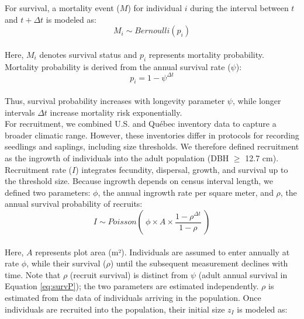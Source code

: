 For survival, a mortality event (\(M\)) for individual \(i\) during the
interval between \(t\) and \(t+\Delta t\) is modeled as:\\

\begin{equation}
M_i \sim Bernoulli(p_i)
\label{eq:survL}\end{equation}\\

Here, \(M_i\) denotes survival status and \(p_i\) represents mortality
probability. Mortality probability is derived from the annual survival
rate (\(\psi\)):\\

\begin{equation}
p_i = 1 - \psi^{\Delta t}
\label{eq:survP}\end{equation}\\

Thus, survival probability increases with longevity parameter \(\psi\),
while longer intervals \(\Delta t\) increase mortality risk
exponentially.\\

For recruitment, we combined U.S. and Québec inventory data to capture a
broader climatic range. However, these inventories differ in protocols
for recording seedlings and saplings, including size thresholds. We
therefore defined recruitment as the ingrowth of individuals into the
adult population (DBH \(\ge\) 12.7 cm).\\

Recruitment rate (\(I\)) integrates fecundity, dispersal, growth, and
survival up to the threshold size. Because ingrowth depends on census
interval length, we defined two parameters: \(\phi\), the annual
ingrowth rate per square meter, and \(\rho\), the annual survival
probability of recruits:\\

\begin{equation}
I \sim Poisson(~\phi \times A \times\frac{1 - \rho^{\Delta t}}{1 - \rho}~)
\label{eq:rec}\end{equation}\\

Here, \(A\) represents plot area (m²). Individuals are assumed to enter
annually at rate \(\phi\), while their survival (\(\rho\)) until the
subsequent measurement declines with time. Note that \(\rho\) (recruit
survival) is distinct from \(\psi\) (adult annual survival in Equation
\ref{eq:survP}); the two parameters are estimated independently.
\(\rho\) is estimated from the data of individuals arriving in the
population. Once individuals are recruited into the population, their
initial size \(z_I\) is modeled as:\\

